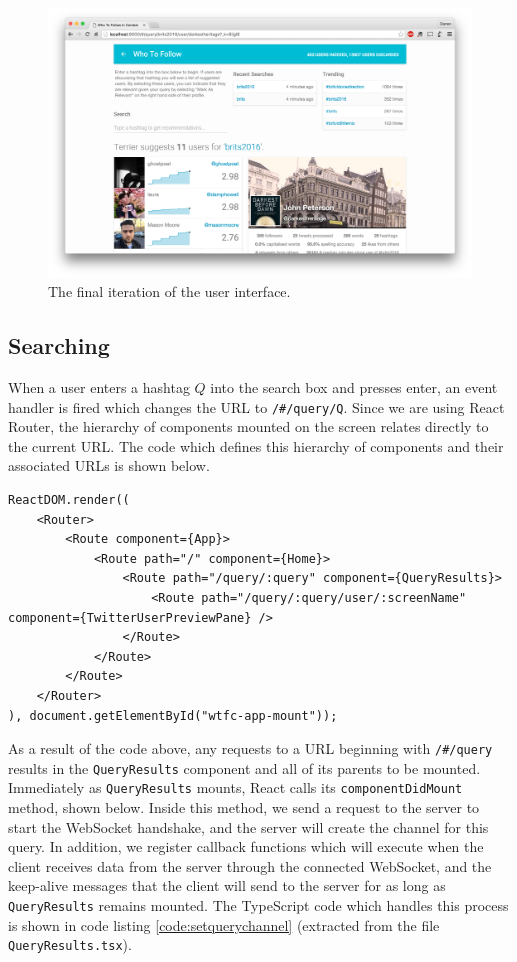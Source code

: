 \documentclass{l4proj}
\newcommand{\code}[1]{\texttt{#1}}
\begin{document}
\begin{figure}[H]
\centering
\includegraphics[scale=0.17]{finalscreenshot.png}
\caption{The final iteration of the user interface.}
\label{finalscreenshot}
\end{figure}             
        
        \subsection{Searching}
        When a user enters a hashtag $Q$ into the search box and presses enter, an event handler is fired which changes the URL to \code{/\#/query/Q}. Since we are using React Router, the hierarchy of components mounted on the screen relates directly to the current URL. The code which defines this hierarchy of components and their associated URLs is shown below.
        
\begin{lstlisting}[caption=Definition of the hierarchy of React component and how they map to the URL.]
ReactDOM.render((
    <Router>
        <Route component={App}>
            <Route path="/" component={Home}>
                <Route path="/query/:query" component={QueryResults}>
                    <Route path="/query/:query/user/:screenName" component={TwitterUserPreviewPane} />
                </Route>
            </Route>
        </Route>
    </Router>
), document.getElementById("wtfc-app-mount"));
\end{lstlisting}
         
As a result of the code above, any requests to a URL beginning with \code{/\#/query} results in the \code{QueryResults} component and all of its parents to be mounted. Immediately as \code{QueryResults} mounts, React calls its \code{componentDidMount} method, shown below. Inside this method, we send a request to the server to start the WebSocket handshake, and the server will create the channel for this query. In addition, we register callback functions which will execute when the client receives data from the server through the connected WebSocket, and the keep-alive messages that the client will send to the server for as long as \code{QueryResults} remains mounted. The TypeScript code which handles this process is shown in code listing \ref{code:setquerychannel} (extracted from the file \code{QueryResults.tsx}).
\end{document}
